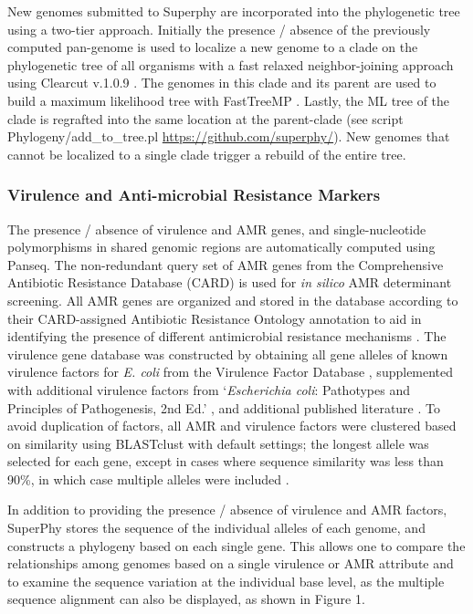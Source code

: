 \documentclass[doublespacing, linenumbers]{bmcart}
\begin{document}
New genomes submitted to Superphy are incorporated into the phylogenetic tree using a two-tier approach. Initially the presence / absence of the previously computed pan-genome is used to localize a new genome to a clade on the phylogenetic tree of all organisms with a fast relaxed neighbor-joining approach using Clearcut v.1.0.9 \cite{sheneman_clearcut:_2006}. The genomes in this clade and its parent are used to build a maximum likelihood tree with FastTreeMP \cite{price_fasttree_2010}. Lastly, the ML tree of the clade is regrafted into the same location at the parent-clade (see script Phylogeny/add_to_tree.pl \url{https://github.com/superphy/}). New genomes that cannot be localized to a single clade trigger a rebuild of the entire tree.

\subsubsection{Virulence and Anti-microbial Resistance Markers}
The presence / absence of virulence and AMR genes, and single-nucleotide polymorphisms in shared genomic regions are automatically computed using Panseq. The non-redundant query set of AMR genes from the Comprehensive Antibiotic Resistance Database (CARD) \cite{mcarthur_comprehensive_2013} is used for \textit{in silico} AMR determinant screening. All AMR genes are organized and stored in the database according to their CARD-assigned Antibiotic Resistance Ontology annotation to aid in identifying the presence of different antimicrobial resistance mechanisms . The virulence gene database was constructed by obtaining all gene alleles of known virulence factors for \textit{E. coli} from the Virulence Factor Database \cite{chen_vfdb_2011}, supplemented with additional virulence factors from `\textit{Escherichia coli}: Pathotypes and Principles of Pathogenesis, 2nd Ed.' , and additional published literature \cite{donnenberg_escherichia_2013}. To avoid duplication of factors, all AMR and virulence factors were clustered based on similarity using BLASTclust with default settings; the longest allele was selected for each gene, except in cases where sequence similarity was less than 90\%, in which case multiple alleles were included \cite{altschul_gapped_1997}.

In addition to providing the presence / absence of virulence and AMR factors, SuperPhy stores the sequence of the individual alleles of each genome, and constructs a phylogeny based on each single gene. This allows one to compare the relationships among genomes based on a single virulence or AMR attribute and to examine the sequence variation at the individual base level, as the multiple sequence alignment can also be displayed, as shown in Figure 1.
\end{document}
